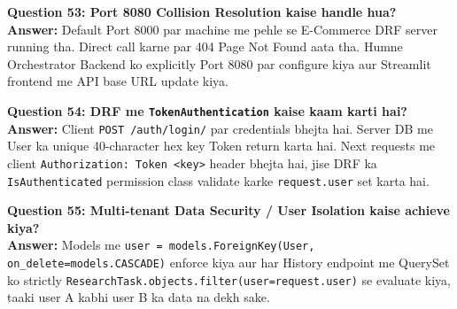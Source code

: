 \documentclass[12pt, a4paper]{article}
\begin{document}
\begin{notebox}
\textbf{Question 53: Port 8080 Collision Resolution kaise handle hua?}\\
\textbf{Answer:} Default Port 8000 par machine me pehle se E-Commerce DRF server running tha. Direct call karne par 404 Page Not Found aata tha. Humne Orchestrator Backend ko explicitly Port 8080 par configure kiya aur Streamlit frontend me API base URL update kiya.
\end{notebox}

\begin{notebox}
\textbf{Question 54: DRF me \texttt{TokenAuthentication} kaise kaam karti hai?}\\
\textbf{Answer:} Client \texttt{POST /auth/login/} par credentials bhejta hai. Server DB me User ka unique 40-character hex key Token return karta hai. Next requests me client \texttt{Authorization: Token <key>} header bhejta hai, jise DRF ka \texttt{IsAuthenticated} permission class validate karke \texttt{request.user} set karta hai.
\end{notebox}

\begin{notebox}
\textbf{Question 55: Multi-tenant Data Security / User Isolation kaise achieve kiya?}\\
\textbf{Answer:} Models me \texttt{user = models.ForeignKey(User, on\_delete=models.CASCADE)} enforce kiya aur har History endpoint me QuerySet ko strictly \texttt{ResearchTask.objects.filter(user=request.user)} se evaluate kiya, taaki user A kabhi user B ka data na dekh sake.
\end{notebox}
\end{document}
